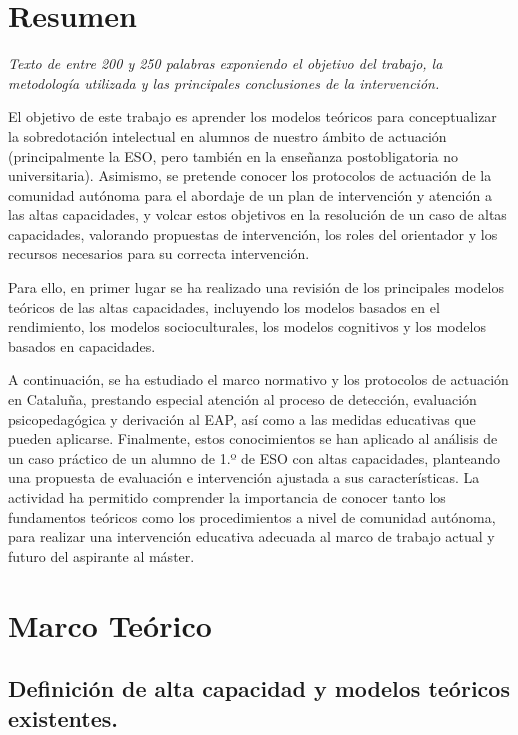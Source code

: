 \documentclass[12pt, a4paper]{article}
\begin{document}
	
	
	
	
	\newpage
	\section{Resumen}
	
	\textit{Texto de entre 200 y 250 palabras exponiendo el objetivo del trabajo, la metodología utilizada y las principales conclusiones de la intervención.}
	
	El objetivo de este trabajo es aprender los modelos teóricos para conceptualizar la sobredotación intelectual en alumnos de nuestro ámbito de actuación (principalmente la ESO, pero también en la enseñanza postobligatoria no universitaria). Asimismo, se pretende conocer los protocolos de actuación de la comunidad autónoma para el abordaje de un plan de intervención y atención a las altas capacidades, y volcar estos objetivos en la resolución de un caso de altas capacidades, valorando propuestas de intervención, los roles del orientador y los recursos necesarios para su correcta intervención.
	
	Para ello, en primer lugar se ha realizado una revisión de los principales modelos teóricos de las altas capacidades, incluyendo los modelos basados en el rendimiento, los modelos socioculturales, los modelos cognitivos y los modelos basados en capacidades.
	
	A continuación, se ha estudiado el marco normativo y los protocolos de actuación en Cataluña, prestando especial atención al proceso de detección, evaluación psicopedagógica y derivación al EAP, así como a las medidas educativas que pueden aplicarse. Finalmente, estos conocimientos se han aplicado al análisis de un caso práctico de un alumno de 1.º de ESO con altas capacidades, planteando una propuesta de evaluación e intervención ajustada a sus características. La actividad ha permitido comprender la importancia de conocer tanto los fundamentos teóricos como los procedimientos a nivel de comunidad autónoma, para realizar una intervención educativa adecuada al marco de trabajo actual y futuro del aspirante al máster.


	
	
	\newpage
	\section{Marco Teórico}
	
	
	\subsection{Definición de alta capacidad y modelos teóricos existentes.}
	
\end{document}
